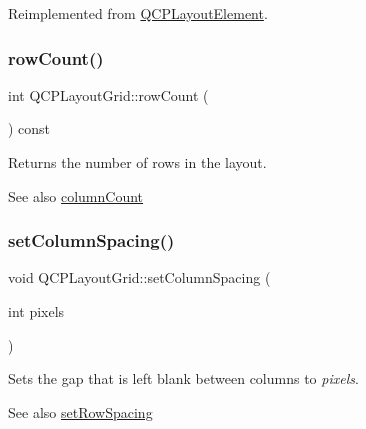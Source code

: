 Reimplemented from \mbox{\hyperlink{class_q_c_p_layout_element_ab3fdb5c9a5189bb2dac10d4d25329cd8}{Q\+C\+P\+Layout\+Element}}.

\mbox{\label{class_q_c_p_layout_grid_a19c66fd76cbce58a8e94f33797e0c0aa}} 
\subsubsection{\texorpdfstring{row\+Count()}{rowCount()}}
{\footnotesize\ttfamily int Q\+C\+P\+Layout\+Grid\+::row\+Count (\begin{DoxyParamCaption}{ }\end{DoxyParamCaption}) const}

Returns the number of rows in the layout.

\begin{DoxySeeAlso}{See also}
\mbox{\hyperlink{class_q_c_p_layout_grid_a1a2962cbf45011405b64b913afa8e7a2}{column\+Count}} 
\end{DoxySeeAlso}
\mbox{\label{class_q_c_p_layout_grid_a3a49272aba32bb0fddc3bb2a45a3dba0}} 
\subsubsection{\texorpdfstring{set\+Column\+Spacing()}{setColumnSpacing()}}
{\footnotesize\ttfamily void Q\+C\+P\+Layout\+Grid\+::set\+Column\+Spacing (\begin{DoxyParamCaption}\item[{int}]{pixels }\end{DoxyParamCaption})}

Sets the gap that is left blank between columns to {\itshape pixels}.

\begin{DoxySeeAlso}{See also}
\mbox{\hyperlink{class_q_c_p_layout_grid_aaef2cd2d456197ee06a208793678e436}{set\+Row\+Spacing}} 
\end{DoxySeeAlso}
\mbox{\label{class_q_c_p_layout_grid_ae38f31a71687b9d7ee3104852528fb50}} 
